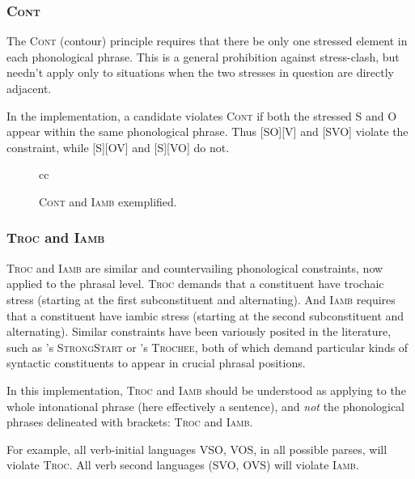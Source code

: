 \documentclass{article}
\newcommand{\cont}{\textsc{Cont}}
\newcommand{\iamb}{\textsc{Iamb}}
\newcommand{\troc}{\textsc{Troc}}
\begin{document}
\subsubsection{\cont}

The {\cont} (contour) principle requires that there be only one stressed element in each phonological phrase.
This is a general prohibition against stress-clash, but needn't apply only to situations when the two stresses in question are directly adjacent.

In the implementation, a candidate violates {\cont} if both the stressed S and O appear within the same phonological phrase.
Thus [SO][V] and [SVO] violate the constraint, while [S][OV] and [S][VO] do not.

\begin{figure}
\begin{center}
\begin{tableau}{cc}
		\const{\cont}	\const{\iamb}
	\cand[\Optimal]{[S][OV]} \vio{}		\vio{}
	\cand{[S][VO]} \vio{}		\vio{*!}
	\cand{[SO][V]} \vio{*!}\vio{}
	\cand{[SOV]} \vio{*!}\vio{}
	\cand{[SVO]} \vio{*!}	\vio{*}
\end{tableau}
\end{center}
	\caption{\cont{} and {\iamb} exemplified.}
\end{figure}

\subsubsection{{\troc} and {\iamb}}

{\troc} and {\iamb} are similar and countervailing phonological constraints, now applied to the phrasal level.
{\troc} demands that a constituent have trochaic stress (starting at the first subconstituent and alternating).
And {\iamb} requires that a constituent have iambic stress (starting at the second subconstituent and alternating).
Similar constraints have been variously posited in the literature, such as \textcite{selkirk11}'s \textsc{StrongStart} or \textcite{fitzgerald94}'s \textsc{Trochee}, both of which demand particular kinds of syntactic constituents to appear in crucial phrasal positions.

In this implementation, {\troc} and {\iamb} should be understood as applying to the whole intonational phrase (here effectively a sentence), and \emph{not} the phonological phrases delineated with brackets: {\troc} and {\iamb}.

For example, all verb-initial languages VSO, VOS, in all possible parses, will violate {\troc}.
All verb second languages (SVO, OVS) will violate {\iamb}.
\end{document}
